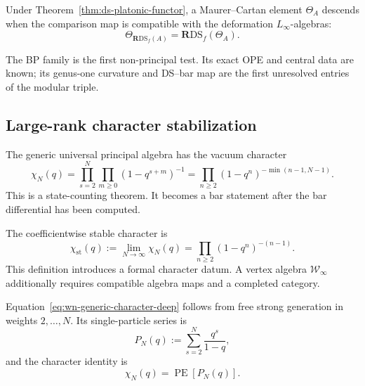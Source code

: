 \begin{corollary}
\label{cor:ds-theta-descent}
\ClaimStatusConditional
Under Theorem~\ref{thm:ds-platonic-functor}, a Maurer--Cartan element
\(\Theta_A\) descends when the comparison map is compatible with the
deformation \(L_\infty\)-algebras:
\[
\Theta_{\mathbf R\mathrm{DS}_f(A)}
=\mathbf R\mathrm{DS}_f(\Theta_A).
\]
\end{corollary}

\begin{remark}
\label{rem:ds-triple-nonprincipal}
The BP family is the first non-principal test.  Its exact OPE and
central data are known; its genus-one curvature and DS--bar map are
the first unresolved entries of the modular triple.
\end{remark}

\subsection{Large-rank character stabilization}
\label{sec:w-infty}
\label{sec:w-completion-kinematics}

The generic universal principal algebra has the vacuum character
\begin{equation}
\label{eq:wn-generic-character-deep}
\chi_N(q)
=\prod_{s=2}^{N}\prod_{m\ge0}(1-q^{s+m})^{-1}
=\prod_{n\ge2}(1-q^n)^{-\min(n-1,N-1)}.
\end{equation}
This is a state-counting theorem.  It becomes a bar statement after
the bar differential has been computed.

\begin{definition}
\label{def:w-infty}
\ClaimStatusDefinitional
The coefficientwise stable character is
\[
\chi_{\mathrm{st}}(q)
:=\lim_{N\to\infty}\chi_N(q)
=\prod_{n\ge2}(1-q^n)^{-(n-1)}.
\]
This definition introduces a formal character datum.  A vertex
algebra \(\mathcal W_\infty\) additionally requires compatible
algebra maps and a completed category.
\end{definition}

\begin{proposition}
\label{prop:wn-character-primitive}
\ClaimStatusProvedHere
Equation~\eqref{eq:wn-generic-character-deep} follows from free strong
generation in weights \(2,\ldots,N\).  Its single-particle series is
\begin{equation}
\label{eq:primitive-series}
P_N(q):=\sum_{s=2}^{N}\frac{q^s}{1-q},
\end{equation}
and the character identity is
\begin{equation}
\label{eq:free-algebra-inversion}
\chi_N(q)=\operatorname{PE}[P_N(q)].
\end{equation}
\end{proposition}

